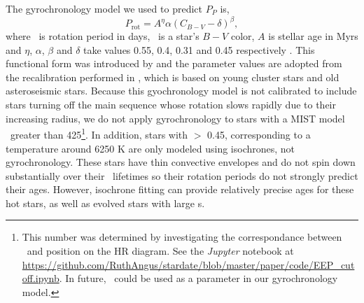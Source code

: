 The gyrochronology model we used to predict $P_P$ is, %
\begin{equation}
    P_\mathrm{rot} = A^\eta \alpha (C_{B-V} - \delta)^\beta,
\label{eqn:gyro}
\end{equation}
where \prot\ is rotation period in days, \cbv\ is a star's $B-V$ color, $A$ is
stellar age in Myrs and $\eta$, $\alpha$, $\beta$ and $\delta$ take values
0.55, 0.4, 0.31 and 0.45 respectively \citep{angus2015}.
This functional form was introduced by \citep{barnes2007} and the parameter
values are adopted from the recalibration performed in \citet{angus2015},
which is based on young cluster stars and old asteroseismic stars.
Because this gyochronology model is not calibrated to include stars turning
off the main sequence whose rotation slows rapidly due to their increasing
radius, we do not apply gyrochronology to stars with a MIST model \eep\
greater than 425\footnote{This number was determined by investigating the
correspondance between \eep\ and position on the HR diagram.
See the {\it Jupyter} notebook at
\url{https://github.com/RuthAngus/stardate/blob/master/paper/code/EEP_cutoff.ipynb}.
In future, \eep\ could be used as a parameter in our gyrochronology model.
}.
In addition, stars with \cbv $>$ 0.45, corresponding to a temperature around
6250 K are only modeled using isochrones, not gyrochronology.
These stars have thin convective envelopes and do not spin down substantially
over their \ms\ lifetimes so their rotation periods do not strongly predict
their ages.
However, isochrone fitting can provide relatively precise ages for these hot
stars, as well as evolved stars with large \eep s.

